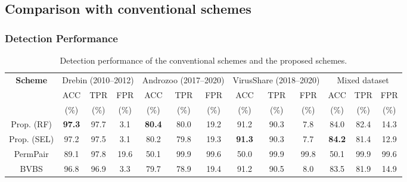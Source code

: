 \documentclass{ieeeaccess}
\newlength\savedwidth
\newcommand{\wcline}[1]{\noalign{\global\savedwidth\arrayrulewidth\global\arrayrulewidth 1.0pt} \cline{#1}
\noalign{\global\arrayrulewidth\savedwidth}}
\begin{document}

\subsection{Comparison with conventional schemes} \label{sec:comparison}
\subsubsection{Detection Performance} \label{sec:detection_performance}
\begin{table}[t]
  \begin{center}
    \caption{Detection performance of the conventional schemes and the proposed schemes.}
    \label{tab:detection_performance} 
    \begin{tabular}{|c|c|c|c|c|c|c|c|c|c|c|c|c|} 
      \hline
      \multirow{3}{*}{\textbf{Scheme}} & \multicolumn{3}{c|}{Drebin (2010--2012) } & \multicolumn{3}{c|}{Androzoo (2017--2020)} & \multicolumn{3}{c|}{VirusShare (2018--2020)}& \multicolumn{3}{c|}{Mixed dataset}\\ \cline{2-13}
                                       & ACC  & TPR & FPR & ACC & TPR & FPR & ACC & TPR & FPR & ACC & TPR & FPR \\ 
                                       & (\%) & (\%) & (\%) & (\%) & (\%) & (\%) & (\%) & (\%) & (\%) & (\%) & (\%) & (\%) \\ \hline 
      Prop. (RF)  & \textbf{97.3} & 97.7 & 3.1 & \textbf{80.4} & 80.0 & 19.2 & 91.2 & 90.3 & 7.8 & 84.0 & 82.4 & 14.3 \\ 
      Prop. (SEL)  & 97.2 & 97.5 & 3.1 & 80.2 & 79.8 & 19.3 & \textbf{91.3} & 90.3 & 7.7 & \textbf{84.2} & 81.4 & 12.9 \\ 
      PermPair \cite{arora2019permpair}  & 89.1 & 97.8 & 19.6 & 50.1 & 99.9 & 99.6 & 50.0 & 99.9 & 99.8 & 50.1 & 99.9 & 99.6 \\ 
      BVBS \cite{liu2014two} & 96.8 & 96.9 & 3.3 & 79.7 & 78.9 & 19.4 & 91.2 & 90.5 & 8.0 & 83.5 & 81.9 & 14.9 \\ 
      \hline
    \end{tabular}
  \end{center}
\end{table} 
\end{document}
